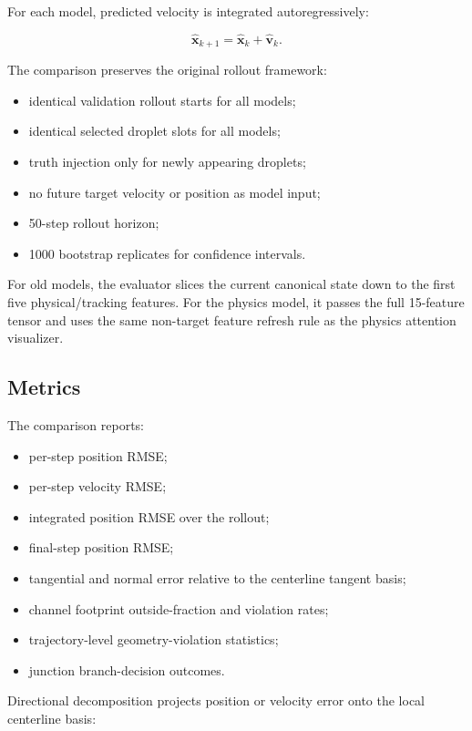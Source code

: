 For each model, predicted velocity is integrated autoregressively:

\[
\hat{\mathbf{x}}_{k+1}
=
\hat{\mathbf{x}}_k
+
\hat{\mathbf{v}}_k.
\]

The comparison preserves the original rollout framework:

\begin{itemize}
  \item identical validation rollout starts for all models;
  \item identical selected droplet slots for all models;
  \item truth injection only for newly appearing droplets;
  \item no future target velocity or position as model input;
  \item 50-step rollout horizon;
  \item 1000 bootstrap replicates for confidence intervals.
\end{itemize}

For old models, the evaluator slices the current canonical state down to the
first five physical/tracking features.  For the physics model, it passes the
full 15-feature tensor and uses the same non-target feature refresh rule as the
physics attention visualizer.

\subsection{Metrics}

The comparison reports:

\begin{itemize}
  \item per-step position RMSE;
  \item per-step velocity RMSE;
  \item integrated position RMSE over the rollout;
  \item final-step position RMSE;
  \item tangential and normal error relative to the centerline tangent basis;
  \item channel footprint outside-fraction and violation rates;
  \item trajectory-level geometry-violation statistics;
  \item junction branch-decision outcomes.
\end{itemize}

Directional decomposition projects position or velocity error onto the local
centerline basis:

